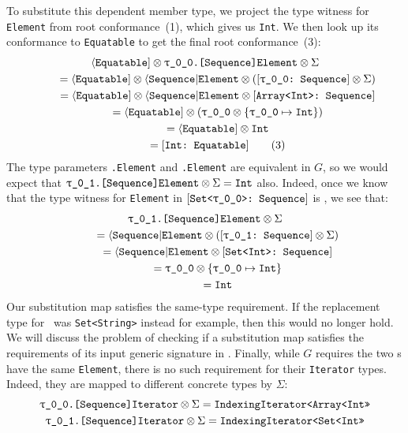 \documentclass[../generics]{subfiles}
\begin{document}
\begin{example}
To substitute this dependent member type, we project the type witness for \texttt{Element} from root conformance~(1), which gives us \texttt{Int}. We then look up its conformance to \texttt{Equatable} to get the final root conformance~(3):
\begin{gather*}
\Proto{Equatable} \otimes \texttt{\rT.[Sequence]Element} \otimes \Sigma\\
\qquad {} = \Proto{Equatable} \otimes \AElement \otimes (\rTSequence \otimes \Sigma)\\
\qquad {} = \Proto{Equatable} \otimes \AElement \otimes \ConfReq{Array<Int>}{Sequence}\\
\qquad {} = \Proto{Equatable} \otimes (\rT \otimes \SubMapInt)\\
\qquad {} = \Proto{Equatable} \otimes \texttt{Int}\\
\qquad {} = \ConfReq{Int}{Equatable}\tag{3}
\end{gather*}
The type parameters \texttt{\rT.Element} and \texttt{\rU.Element} are equivalent in $G$, so we would expect that $\texttt{\rU.[Sequence]Element}\otimes\Sigma=\texttt{Int}$ also. Indeed, once we know that the type witness for \texttt{Element} in $\ConfReq{Set<\rT>}{Sequence}$ is \rT, we see that:
\begin{gather*}
\texttt{\rU.[Sequence]Element}\otimes\Sigma\\
\qquad {} = \AElement \otimes (\rUSequence \otimes \Sigma)\\
\qquad {} = \AElement \otimes \ConfReq{Set<Int>}{Sequence}\\
\qquad {} = \rT \otimes \SubMapInt\\
\qquad {} = \texttt{Int}
\end{gather*}
Our substitution map satisfies the same-type requirement. If the replacement type for \rU\ was \texttt{Set<String>} instead for example, then this would no longer hold. We will discuss the problem of checking if a substitution map satisfies the requirements of its input generic signature in . Finally, while $G$ requires the two \tSequence{}s have the same \texttt{Element}, there is no such requirement for their \texttt{Iterator} types. Indeed, they are mapped to different concrete types by $\Sigma$:
\begin{gather*}
\texttt{\rT.[Sequence]Iterator}\otimes\Sigma = \texttt{IndexingIterator<Array<Int>>}\\
\texttt{\rU.[Sequence]Iterator}\otimes\Sigma = \texttt{IndexingIterator<Set<Int>>}
\end{gather*}
\end{example}
\end{document}
